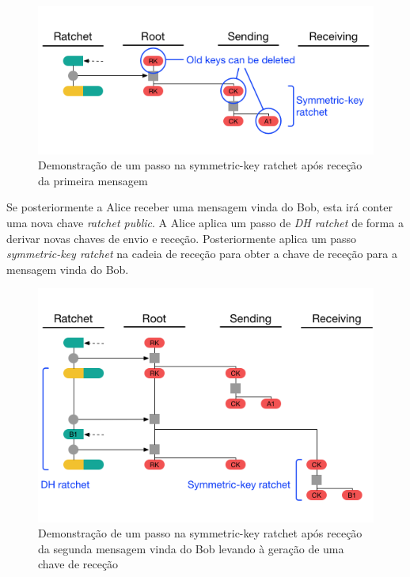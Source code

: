 \begin{figure}[H]
\begin{center}
\includegraphics[width=12cm]{img/DR2.png}
\caption{Demonstração de um passo na symmetric-key ratchet após receção da primeira mensagem}
\label{diagram:DR2} 
\centering
\end{center}
\end{figure}

Se posteriormente a Alice receber uma mensagem vinda do Bob, esta irá conter uma nova chave \textit{ratchet public}. A Alice aplica um passo de \textit{DH ratchet} de forma a derivar novas chaves de envio e receção. Posteriormente aplica um passo \textit{symmetric-key ratchet} na cadeia de receção para obter a chave de receção para a mensagem vinda do Bob.

\begin{figure}[H]
\begin{center}
\includegraphics[width=12cm]{img/DR3.png}
\caption{Demonstração de um passo na symmetric-key ratchet após receção da segunda mensagem vinda do Bob levando à geração de uma chave de receção}
\label{diagram:DR3} 
\centering
\end{center}
\end{figure}

